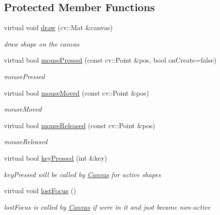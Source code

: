 \subsection*{Protected Member Functions}
\begin{DoxyCompactItemize}
\item 
virtual void \hyperlink{classcanvascv_1_1CompoundShape_a6ec60ee0340ed25274e3ac1349345953}{draw} (cv\+::\+Mat \&canvas)
\begin{DoxyCompactList}\small\item\em draw shape on the canvas \end{DoxyCompactList}\item 
virtual bool \hyperlink{classcanvascv_1_1CompoundShape_a821d046dceaba47114385d1c87e197ce}{mouse\+Pressed} (const cv\+::\+Point \&pos, bool on\+Create=false)
\begin{DoxyCompactList}\small\item\em mouse\+Pressed \end{DoxyCompactList}\item 
virtual bool \hyperlink{classcanvascv_1_1CompoundShape_a387d1705b99d2053306ffd8d8e67b63b}{mouse\+Moved} (const cv\+::\+Point \&pos)
\begin{DoxyCompactList}\small\item\em mouse\+Moved \end{DoxyCompactList}\item 
virtual bool \hyperlink{classcanvascv_1_1CompoundShape_a01cf027fd5f7ec96525949d0c8ae08a1}{mouse\+Released} (const cv\+::\+Point \&pos)
\begin{DoxyCompactList}\small\item\em mouse\+Released \end{DoxyCompactList}\item 
virtual bool \hyperlink{classcanvascv_1_1CompoundShape_ac739f68737099c6f5c6d2c70196cd07b}{key\+Pressed} (int \&key)
\begin{DoxyCompactList}\small\item\em key\+Pressed will be called by \hyperlink{classcanvascv_1_1Canvas}{Canvas} for active shapes \end{DoxyCompactList}\item 
virtual void \hyperlink{classcanvascv_1_1CompoundShape_a4a448d90183494b264d7f673f3c613b4}{lost\+Focus} ()\hypertarget{classcanvascv_1_1CompoundShape_a4a448d90183494b264d7f673f3c613b4}{}\label{classcanvascv_1_1CompoundShape_a4a448d90183494b264d7f673f3c613b4}

\begin{DoxyCompactList}\small\item\em lost\+Focus is called by \hyperlink{classcanvascv_1_1Canvas}{Canvas} if we\textquotesingle{}re in it and just became non-\/active \end{DoxyCompactList}\end{DoxyCompactItemize}
